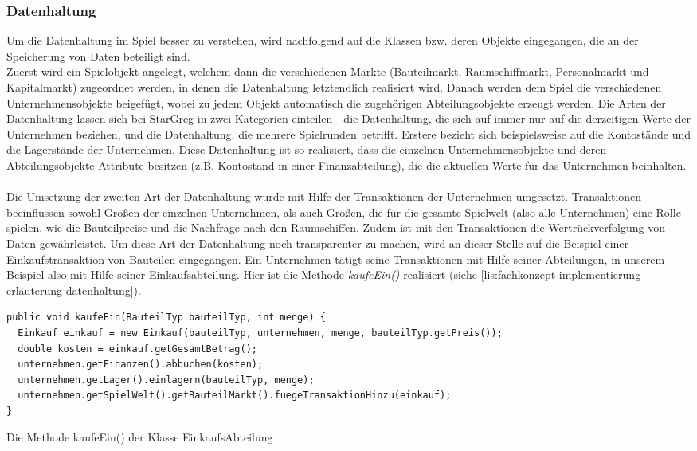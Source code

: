 \subsubsection{Datenhaltung}
\label{subsub:fachkonzept-implementierung-erläuterung-datenhaltung}

Um die Datenhaltung im Spiel besser zu verstehen, wird nachfolgend auf die Klassen bzw. deren Objekte eingegangen, die an der Speicherung von Daten beteiligt sind.
\\
Zuerst wird ein Spielobjekt angelegt, welchem dann die verschiedenen Märkte (Bauteilmarkt, Raumschiffmarkt, Personalmarkt und Kapitalmarkt) zugeordnet werden, in denen die Datenhaltung letztendlich realisiert wird. Danach werden dem Spiel die verschiedenen Unternehmensobjekte beigefügt, wobei zu jedem Objekt automatisch die zugehörigen Abteilungsobjekte erzeugt werden. Die Arten der Datenhaltung lassen sich bei StarGreg in zwei Kategorien einteilen - die Datenhaltung, die sich auf immer nur auf die derzeitigen Werte der Unternehmen beziehen, und die Datenhaltung, die mehrere Spielrunden betrifft. Erstere bezieht sich beispielsweise auf die Kontostände und die Lagerstände der Unternehmen. Diese Datenhaltung ist so realisiert, dass die einzelnen Unternehmensobjekte und deren Abteilungsobjekte Attribute besitzen (z.B. Kontostand in einer Finanzabteilung), die die aktuellen Werte für das Unternehmen beinhalten.
\\
\\
Die Umsetzung der zweiten Art der Datenhaltung wurde mit Hilfe der Transaktionen der Unternehmen umgesetzt. Transaktionen beeinflussen sowohl Größen der einzelnen Unternehmen, als auch Größen, die für die gesamte Spielwelt (also alle Unternehmen) eine Rolle spielen, wie die Bauteilpreise und die Nachfrage nach den Raumschiffen. Zudem ist mit den Transaktionen die Wertrückverfolgung von Daten gewährleistet. Um diese Art der Datenhaltung noch transparenter zu machen, wird an dieser Stelle auf die Beispiel einer Einkaufstransaktion von Bauteilen eingegangen. Ein Unternehmen tätigt seine Transaktionen mit Hilfe seiner Abteilungen, in unserem Beispiel also mit Hilfe seiner Einkaufsabteilung. Hier ist die Methode \textit{kaufeEin()} realisiert (siehe \ref{lis:fachkonzept-implementierung-erläuterung-datenhaltung}).

\begin{programm}[htbp]
\begin{lstlisting}[breaklines=true]
public void kaufeEin(BauteilTyp bauteilTyp, int menge) {
  Einkauf einkauf = new Einkauf(bauteilTyp, unternehmen, menge, bauteilTyp.getPreis());
  double kosten = einkauf.getGesamtBetrag();
  unternehmen.getFinanzen().abbuchen(kosten);
  unternehmen.getLager().einlagern(bauteilTyp, menge);
  unternehmen.getSpielWelt().getBauteilMarkt().fuegeTransaktionHinzu(einkauf);
}
\end{lstlisting}
\caption{Die Methode kaufeEin() der Klasse EinkaufsAbteilung\label{lis:fachkonzept-implementierung-erläuterung-datenhaltung}}
\end{programm}

